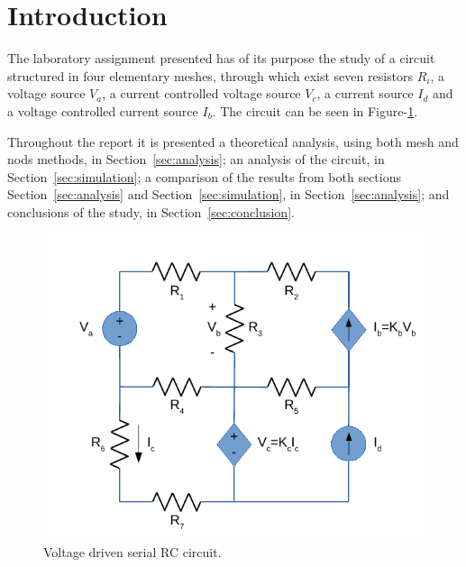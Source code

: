 \section{Introduction}
\label{sec:introduction}

The laboratory assignment presented has of its purpose the study of a circuit
structured in four elementary meshes, through which exist seven resistors $R_i$,
a voltage source $V_a$, a current controlled voltage source $V_c$, a current
source $I_d$ and a voltage controlled current source $I_b$. The circuit can
be seen in Figure-\ref{fig:circuit}.

\lipsum[1-1]

Throughout the report it is presented a theoretical analysis, using both mesh
and nods methods, in Section~\ref{sec:analysis}; an analysis of the circuit,
in Section~\ref{sec:simulation}; a comparison of the results from both sections
Section~\ref{sec:analysis} and Section~\ref{sec:simulation}, in Section~\ref{sec:analysis};
and conclusions of the study, in Section~\ref{sec:conclusion}.


\begin{figure}[h] \centering
\includegraphics[width=0.4\linewidth]{circuit.pdf}
\caption{Voltage driven serial RC circuit.}
\label{fig:circuit}
\end{figure}

